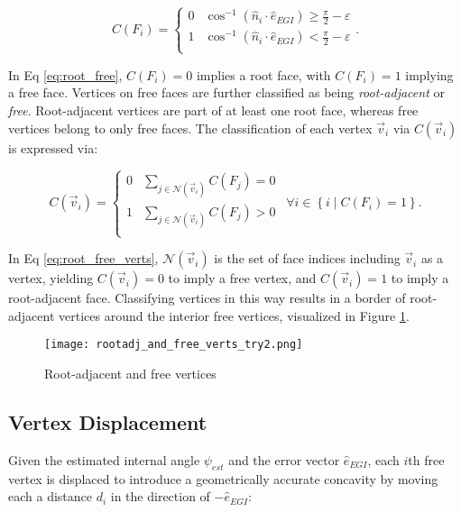\begin{equation} \label{eq:root_free}
  C(F_i) = \begin{cases} 
    0 & \cos^{-1}\left( \hat{n}_i \cdot \hat{e}_{EGI} \right) \geq \frac{\pi}{2} - \varepsilon \\
    1 & \cos^{-1}\left( \hat{n}_i \cdot \hat{e}_{EGI} \right) < \frac{\pi}{2} - \varepsilon \\
  \end{cases}.
\end{equation}

In Eq \ref{eq:root_free}, $C(F_i) = 0$ implies a root face, with $C(F_i) = 1$ implying a free face. Vertices on free faces are further classified as being \textit{root-adjacent} or \textit{free}. Root-adjacent vertices are part of at least one root face, whereas free vertices belong to only free faces. The classification of each vertex $\vec{v}_i$ via $C(\vec{v}_i)$ is expressed via:

\begin{equation} \label{eq:root_free_verts}
  C(\vec{v}_i) = \begin{cases}
    0 & \sum_{j \in \mathcal{N}(\vec{v}_i)}{C(F_j)} = 0 \\
    1 & \sum_{j \in \mathcal{N}(\vec{v}_i)}{C(F_j)} > 0 \\    
  \end{cases} \: \: \forall i \in \left\{ i \mid C(F_i) = 1 \right\}.
\end{equation}

In Eq \ref{eq:root_free_verts}, $\mathcal{N}(\vec{v}_i)$ is the set of face indices including $\vec{v}_i$ as a vertex, yielding $C(\vec{v}_i) = 0$ to imply a free vertex, and $C(\vec{v}_i) = 1$ to imply a root-adjacent face. Classifying vertices in this way results in a border of root-adjacent vertices around the interior free vertices, visualized in Figure \ref{fig:root_and_free}.

\begin{figure}[!htb]
  \centering
  \texttt{[image: rootadj\_and\_free\_verts\_try2.png]}
  \caption{Root-adjacent and free vertices}
  \label{fig:root_and_free}
\end{figure}

\subsection{Vertex Displacement}

Given the estimated internal angle $\psi_{est}$ and the error vector $\hat{e}_{EGI}$, each $i$th free vertex is displaced to introduce a geometrically accurate concavity by moving each a distance $d_i$ in the direction of $-\hat{e}_{EGI}$:

